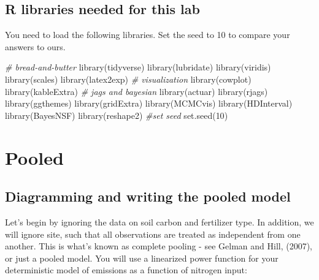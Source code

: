 \documentclass[
]{article}
\newenvironment{Shaded}{\begin{snugshade}}{\end{snugshade}}
\newcommand{\CommentTok}[1]{\textcolor[rgb]{0.56,0.35,0.01}{\textit{#1}}}
\newcommand{\DecValTok}[1]{\textcolor[rgb]{0.00,0.00,0.81}{#1}}
\newcommand{\FunctionTok}[1]{\textcolor[rgb]{0.00,0.00,0.00}{#1}}
\newcommand{\NormalTok}[1]{#1}
\begin{document}
\hypertarget{r-libraries-needed-for-this-lab}{%
\subsection{R libraries needed for this
lab}\label{r-libraries-needed-for-this-lab}}

You need to load the following libraries. Set the seed to 10 to compare
your answers to ours.

\begin{Shaded}
\begin{Highlighting}[]
\CommentTok{\# bread{-}and{-}butter}
\FunctionTok{library}\NormalTok{(tidyverse)}
\FunctionTok{library}\NormalTok{(lubridate)}
\FunctionTok{library}\NormalTok{(viridis)}
\FunctionTok{library}\NormalTok{(scales)}
\FunctionTok{library}\NormalTok{(latex2exp)}
\CommentTok{\# visualization}
\FunctionTok{library}\NormalTok{(cowplot)}
\FunctionTok{library}\NormalTok{(kableExtra)}
\CommentTok{\# jags and bayesian}
\FunctionTok{library}\NormalTok{(actuar)}
\FunctionTok{library}\NormalTok{(rjags)}
\FunctionTok{library}\NormalTok{(ggthemes)}
\FunctionTok{library}\NormalTok{(gridExtra)}
\FunctionTok{library}\NormalTok{(MCMCvis)}
\FunctionTok{library}\NormalTok{(HDInterval)}
\FunctionTok{library}\NormalTok{(BayesNSF)}
\FunctionTok{library}\NormalTok{(reshape2)}
\CommentTok{\#set seed}
\FunctionTok{set.seed}\NormalTok{(}\DecValTok{10}\NormalTok{)}
\end{Highlighting}
\end{Shaded}

\hypertarget{pooled}{%
\section{Pooled}\label{pooled}}

\hypertarget{diagramming-and-writing-the-pooled-model}{%
\subsection{Diagramming and writing the pooled
model}\label{diagramming-and-writing-the-pooled-model}}

Let's begin by ignoring the data on soil carbon and fertilizer type. In
addition, we will ignore site, such that all observations are treated as
independent from one another. This is what's known as complete pooling -
see Gelman and Hill, (2007), or just a pooled model. You will use a
linearized power function for your deterministic model of emissions as a
function of nitrogen input:
\end{document}
